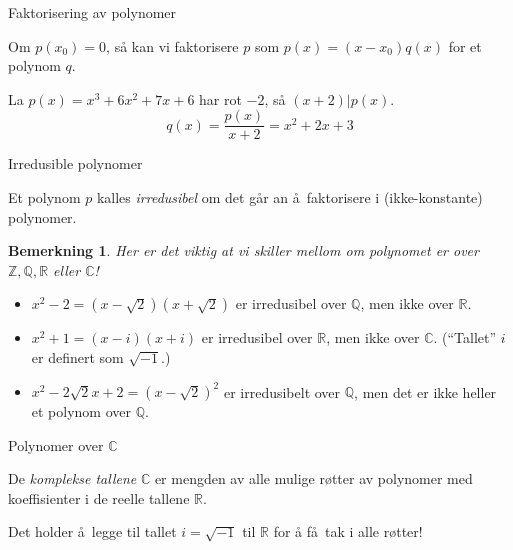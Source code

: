 \documentclass[norsk]{beamer}
\theoremstyle{example}
\newtheorem{remark}{Bemerkning}
\begin{document}
\begin{frame}{Faktorisering av polynomer}
    \begin{lemma}
        Om $p(x_0) = 0$, så kan vi faktorisere $p$ som $p(x) = (x - x_0)q(x)$
        for et polynom $q$.
    \end{lemma}
    \pause
    \begin{example}
        La $p(x) = x^3 + 6x^2 + 7x + 6$ har rot $-2$,
        så $(x + 2) | p(x)$.
        \[
            q(x) = \frac {p(x)}{x + 2} = x^2 + 2x + 3
        \]
    \end{example}
\end{frame}

\begin{frame}{Irredusible polynomer}
    \begin{definition}
        Et polynom $p$ kalles \textit{irredusibel} om det går an å faktorisere i
        (ikke-konstante) polynomer.
    \end{definition}
    \begin{remark}
        Her er det viktig at vi skiller mellom om polynomet er over
        $\mathbb Z,\mathbb Q, \mathbb R$ eller $\mathbb C$!
    \end{remark}
    \pause
    \begin{example}
        \begin{itemize}
            \item $x^2 - 2 = (x - \sqrt 2)(x + \sqrt 2)$ er irredusibel over $\mathbb Q$,
                men ikke over $\mathbb R$.
            \item $x^2 + 1 = (x - i)(x + i)$ er irredusibel over $\mathbb R$,
                men ikke over $\mathbb C$. (``Tallet'' $i$ er definert som $\sqrt {-1}$.)
            \item $x^2 - 2\sqrt 2 x + 2 = {(x - \sqrt 2)}^2$ er irredusibelt over $\mathbb Q$,
                men det er ikke heller et polynom over $\mathbb Q$.
        \end{itemize}
    \end{example}
\end{frame}

\begin{frame}{Polynomer over $\mathbb C$}
    \begin{definition}
        De \textit{komplekse tallene} $\mathbb C$ er mengden av
        alle mulige røtter av polynomer med koeffisienter i
        de reelle tallene $\mathbb R$.
    \end{definition}
    \begin{fact}
        Det holder å legge til tallet $i = \sqrt{-1}$ til $\mathbb R$ for å
        få tak i alle røtter!
    \end{fact}
\end{frame}
\end{document}
